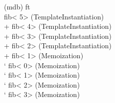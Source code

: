 
\begin{tttenv}
(mdb) ft \\
fib<{\color{color04} 5}> (TemplateInstantiation) \\
{\color{color03} + }fib<{\color{color04} 4}> (TemplateInstantiation) \\
{\color{color03} \textbar{} }{\color{color06} + }fib<{\color{color04} 3}>
(TemplateInstantiation) \\
{\color{color03} \textbar{} }{\color{color06} \textbar{} }{\color{color07} + }fib<{\color{color04} 2}>
(TemplateInstantiation) \\
{\color{color03} \textbar{} }{\color{color06} \textbar{} }{\color{color07} \textbar{}
}{\color{color08} + }fib<{\color{color04} 1}> (Memoization) \\
{\color{color03} \textbar{} }{\color{color06} \textbar{} }{\color{color07} \textbar{}
}{\color{color08} ` }fib<{\color{color04} 0}> (Memoization) \\
{\color{color03} \textbar{} }{\color{color06} \textbar{} }{\color{color07} ` }fib<{\color{color04} 1}>
(Memoization) \\
{\color{color03} \textbar{} }{\color{color06} ` }fib<{\color{color04} 2}>
(Memoization) \\
{\color{color03} ` }fib<{\color{color04} 3}> (Memoization)
\end{tttenv}

